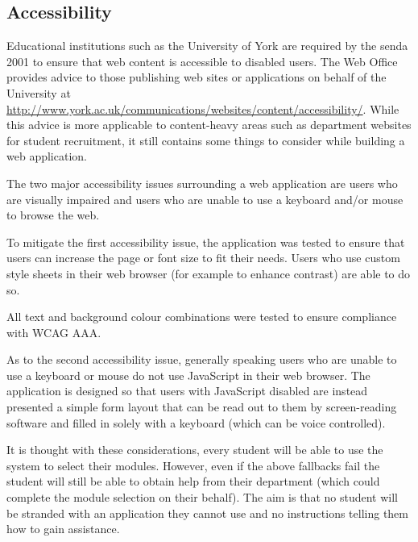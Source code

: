 \documentclass[draft]{scrartcl}
\begin{document}
\subsection{Accessibility}


Educational institutions such as the University of York are required by the
\gls{senda} 2001 to ensure that web content is accessible to disabled users.
The Web Office provides advice to those publishing web sites or applications
on behalf of the University at
\url{http://www.york.ac.uk/communications/websites/content/accessibility/}.
While this advice is more applicable to content-heavy areas such as department
websites for student recruitment, it still contains some things to consider
while building a web application.


The two major accessibility issues surrounding a web application are users who
are visually impaired and users who are unable to use a keyboard and/or mouse
to browse the web.

To mitigate the first accessibility issue, the application was tested to
ensure that users can increase the page or font size to fit their needs. Users
who use custom style sheets in their web browser (for example to enhance
contrast) are able to do so.

All text and background colour combinations were tested to ensure compliance
with WCAG AAA.


As to the second accessibility issue, generally speaking users who are unable
to use a keyboard or mouse do not use JavaScript in their web browser. The
application is designed so that users with JavaScript disabled are instead
presented a simple form layout that can be read out to them by screen-reading
software and filled in solely with a keyboard (which can be voice controlled).

It is thought with these considerations, every student will be able to use the
system to select their modules. However, even if the above fallbacks fail the
student will still be able to obtain help from their department (which could
complete the module selection on their behalf). The aim is that no student
will be stranded with an application they cannot use and no instructions
telling them how to gain assistance.
\end{document}
